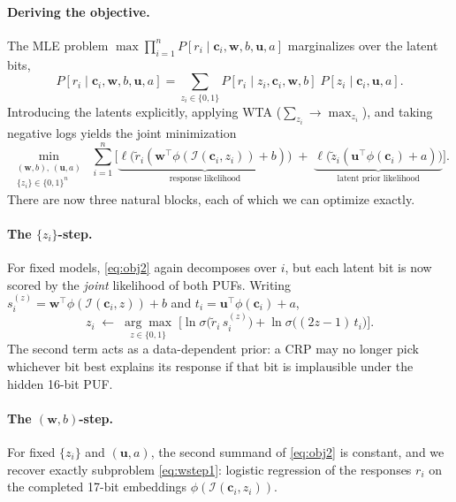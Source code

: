 \documentclass{article}
\newcommand{\vw}{\mathbf{w}}
\newcommand{\vu}{\mathbf{u}}
\newcommand{\vc}{\mathbf{c}}
\newcommand{\ins}{\mathcal{I}}
\begin{document}
\paragraph{Deriving the objective.}
The MLE problem $\max \prod_{i=1}^n P[r_i \mid \vc_i, \vw, b, \vu, a]$ marginalizes over the
latent bits,
\begin{equation*}
  P[r_i \mid \vc_i, \vw, b, \vu, a]
  = \sum_{z_i \in \{0,1\}} P[r_i \mid z_i, \vc_i, \vw, b]\; P[z_i \mid \vc_i, \vu, a].
\end{equation*}
Introducing the latents explicitly, applying WTA ($\sum_{z_i} \to \max_{z_i}$), and taking
negative logs yields the joint minimization
\begin{equation}
  \label{eq:obj2}
  \min_{\substack{(\vw, b),\, (\vu, a)\\ \{z_i\} \in \{0,1\}^n}}
  \; \sum_{i=1}^{n} \Big[
     \underbrace{\ell\!\big( \tilde r_i (\vw^\top \phi(\ins(\vc_i, z_i)) + b) \big)}_{\text{response likelihood}}
     \;+\;
     \underbrace{\ell\!\big( \tilde z_i (\vu^\top \phi(\vc_i) + a) \big)}_{\text{latent prior likelihood}}
  \Big].
\end{equation}
There are now three natural blocks, each of which we can optimize exactly.

\paragraph{The $\{z_i\}$-step.}
For fixed models, \eqref{eq:obj2} again decomposes over $i$, but each latent bit is now
scored by the \emph{joint} likelihood of both PUFs. Writing
$s_i^{(z)} = \vw^\top \phi(\ins(\vc_i, z)) + b$ and $t_i = \vu^\top \phi(\vc_i) + a$,
\begin{equation}
  \label{eq:zstep2}
  z_i \;\leftarrow\; \underset{z \in \{0,1\}}{\arg\max}\;
  \Big[ \ln \sigma\!\big( \tilde r_i\, s_i^{(z)} \big)
      + \ln \sigma\!\big( (2z - 1)\, t_i \big) \Big] .
\end{equation}
The second term acts as a data-dependent prior: a CRP may no longer pick whichever bit best
explains its response if that bit is implausible under the hidden 16-bit PUF.

\paragraph{The $(\vw, b)$-step.}
For fixed $\{z_i\}$ and $(\vu, a)$, the second summand of \eqref{eq:obj2} is constant, and we
recover exactly subproblem \eqref{eq:wstep1}: logistic regression of the responses $r_i$ on
the completed 17-bit embeddings $\phi(\ins(\vc_i, z_i))$.
\end{document}
